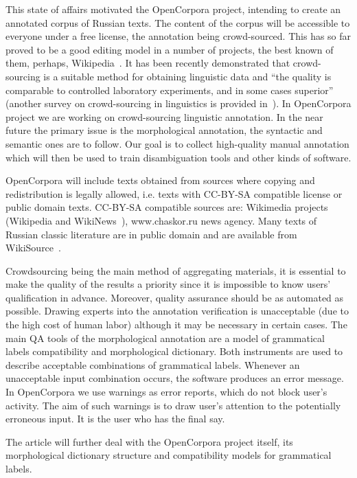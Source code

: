 \documentclass[a4paper]{article}
\begin{document}
This state of affairs motivated the OpenCorpora project, intending to create an annotated corpus of Russian texts. The content of the corpus will be accessible to everyone under a free license, the annotation being crowd-sourced. This has so far proved to be a good editing model in a number of projects, the best known of them, perhaps, Wikipedia~\cite{enwiki}. It has been recently demonstrated that crowd-sourcing is a suitable method for obtaining linguistic data and ``the quality is comparable to controlled laboratory experiments, and in some cases superior''~\cite{munro10} (another survey on crowd-sourcing in linguistics is provided in~\cite{wang10}). In OpenCorpora project we are working on crowd-sourcing linguistic annotation. In the near future the primary issue is the morphological annotation, the syntactic and semantic ones are to follow. Our goal is to collect high-quality manual annotation which will then be used to train disambiguation tools and other kinds of software.

OpenCorpora will include texts obtained from sources where copying and redistribution is legally allowed, i.e. texts with CC-BY-SA compatible license or public domain texts. CC-BY-SA compatible sources are: Wikimedia projects (Wikipedia and WikiNews~\cite{enwikinews}), www.chaskor.ru news agency. Many texts of Russian classic literature are in public domain and are available from WikiSource~\cite{enwikisource}.

Crowdsourcing being the main method of aggregating materials, it is essential to make the quality of the results a priority since it is impossible to know users' qualification in advance. Moreover, quality assurance should be as automated as possible. Drawing experts into the annotation verification is unacceptable (due to the high cost of human labor) although it may be necessary in certain cases. The main QA tools of the morphological annotation are a model of grammatical labels compatibility and morphological dictionary. Both instruments are used to describe acceptable combinations of grammatical labels. Whenever an unacceptable input combination occurs, the software produces an error message. In OpenCorpora we use warnings as error reports, which do not block user's activity. The aim of such warnings is to draw user's attention to the potentially erroneous input. It is the user who has the final say.

The article will further deal with the OpenCorpora project itself, its morphological dictionary structure and compatibility models for grammatical labels.
\end{document}
